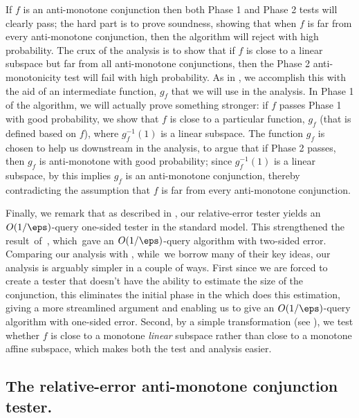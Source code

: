 \documentclass[11pt]{article}
\theoremstyle{definition}
\begin{document}
If $f$ is an anti-monotone conjunction then both Phase 1 and Phase 2 tests will clearly pass; the hard part is to prove soundness, showing that when $f$ is far from every anti-monotone conjunction, then the algorithm will reject with high probability.
The crux of the analysis is to show that if $f$ is close to a linear subspace but far from all anti-monotone conjunctions, then the Phase 2 anti-monotonicity test will fail with high probability.
As in \cite{PRS02}, we accomplish this with the aid of an intermediate function, $g_f$ that we will use in the analysis.
In Phase 1 of the algorithm,  we will actually prove something stronger: if $f$ passes Phase 1 with good probability, we show that $f$ is close to a particular function, $g_f$ (that is defined based on $f$), where $g_f^{-1}(1)$ is a linear subspace. 
The function $g_f$ is chosen to help us downstream in the analysis, to argue that if Phase 2 passes, then $g_f$ is anti-monotone  with good probability; since $g_f^{-1}(1)$ is a linear subspace, by  this implies $g_f$ is an anti-monotone conjunction,
thereby contradicting the assumption that $f$ is far from every anti-monotone conjunction.


Finally, we remark that as described in , our relative-error tester yields an $O(1/\eps)$-query one-sided tester in the standard model.  This strengthened the result~of~\cite{PRS02}, which~gave an $O(1/\eps)$-query algorithm with two-sided error. Comparing our analysis with \cite{PRS02},  while~we borrow many of their key ideas, our analysis is arguably simpler in a couple of ways.   First since we are forced to create a tester that doesn't have the ability to estimate the size of the conjunction, this eliminates the initial phase in the \cite{PRS02} which does this estimation, giving a more streamlined argument {and enabling us to give an $O(1/\eps)$-query algorithm with one-sided error.} Second, by a simple transformation (see  ), we test whether $f$ is close to a monotone {\it linear} subspace rather than close to a monotone affine subspace, which makes both the test and analysis easier. 






\subsection{The relative-error anti-monotone conjunction tester. }
\label{sec:conj-algorithm}
\end{document}
